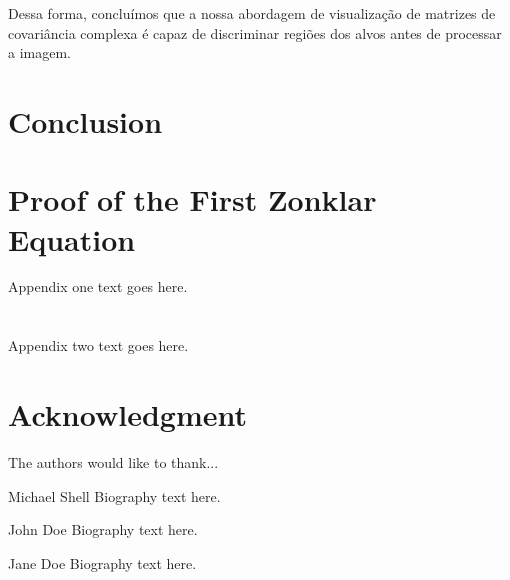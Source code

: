 \documentclass[journal]{IEEEtran}
\begin{document}
Dessa forma, concluímos que a nossa abordagem de visualização de matrizes de covariância complexa é capaz de discriminar regiões dos alvos antes de processar a imagem.








\section{Conclusion}



\appendices
\section{Proof of the First Zonklar Equation}
Appendix one text goes here.

\section{}
Appendix two text goes here.


\section*{Acknowledgment}


The authors would like to thank...


\ifCLASSOPTIONcaptionsoff
  \newpage
\fi









\begin{IEEEbiography}{Michael Shell}
Biography text here.
\end{IEEEbiography}

\begin{IEEEbiographynophoto}{John Doe}
Biography text here.
\end{IEEEbiographynophoto}


\begin{IEEEbiographynophoto}{Jane Doe}
Biography text here.
\end{IEEEbiographynophoto}






\end{document}

